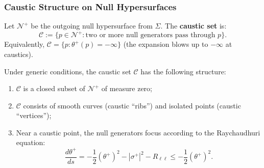 \subsubsection{Caustic Structure on Null Hypersurfaces}

\begin{definition}
\label{def:caustic-set}
Let $\mathcal{N}^+$ be the outgoing null hypersurface from $\Sigma$. The \textbf{caustic set} is:
\begin{equation}
\mathcal{C} := \{p \in \mathcal{N}^+ : \text{two or more null generators pass through } p\}.
\end{equation}
Equivalently, $\mathcal{C} = \{p : \theta^+(p) = -\infty\}$ (the expansion blows up to $-\infty$ at caustics).
\end{definition}

\begin{lemma}
\label{lem:caustic-structure}
Under generic conditions, the caustic set $\mathcal{C}$ has the following structure:
\begin{enumerate}[label=(\roman*)]
\item $\mathcal{C}$ is a closed subset of $\mathcal{N}^+$ of measure zero;
\item $\mathcal{C}$ consists of smooth curves (caustic ``ribs'') and isolated points (caustic ``vertices'');
\item Near a caustic point, the null generators focus according to the Raychaudhuri equation:
\begin{equation}
\frac{d\theta^+}{ds} = -\frac{1}{2}(\theta^+)^2 - |\sigma^+|^2 - R_{\ell\ell} \leq -\frac{1}{2}(\theta^+)^2.
\end{equation}
\end{enumerate}
\end{lemma}

